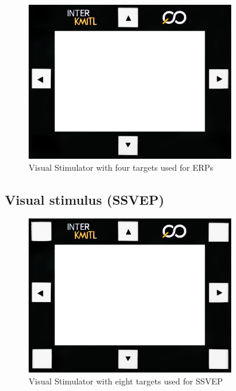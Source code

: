 \begin{figure}[ht]
	\centering
	\includegraphics[width=0.8\textwidth]{chapter7/frame_4.jpg}
	\caption{Visual Stimulator with four targets used for ERPs}
\end{figure}

\subsection{Visual stimulus (SSVEP)}
\begin{figure}[ht]
	\centering
	\includegraphics[width=0.8\textwidth]{chapter7/frame_8.jpg}
	\caption{Visual Stimulator with eight targets used for SSVEP}
\end{figure}